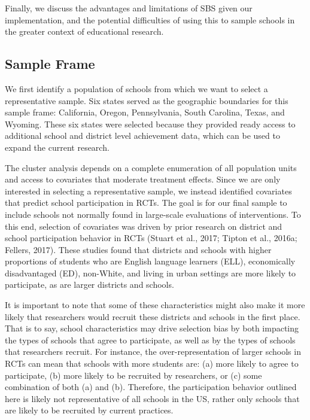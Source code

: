 \documentclass[man,floatsintext]{apa6}
\begin{document}
Finally, we discuss the advantages and limitations of SBS given our implementation, and the potential difficulties of using this to sample schools in the greater context of educational research.

\hypertarget{sample-frame}{%
\subsection{Sample Frame}\label{sample-frame}}

We first identify a population of schools from which we want to select a representative sample. Six states served as the geographic boundaries for this sample frame: California, Oregon, Pennsylvania, South Carolina, Texas, and Wyoming. These six states were selected because they provided ready access to additional school and district level achievement data, which can be used to expand the current research.

The cluster analysis depends on a complete enumeration of all population units and access to covariates that moderate treatment effects. Since we are only interested in selecting a representative sample, we instead identified covariates that predict school participation in RCTs. The goal is for our final sample to include schools not normally found in large-scale evaluations of interventions. To this end, selection of covariates was driven by prior research on district and school participation behavior in RCTs (Stuart et al., 2017; Tipton et al., 2016a; Fellers, 2017). These studies found that districts and schools with higher proportions of students who are English language learners (ELL), economically disadvantaged (ED), non-White, and living in urban settings are more likely to participate, as are larger districts and schools.

It is important to note that some of these characteristics might also make it more likely that researchers would recruit these districts and schools in the first place. That is to say, school characteristics may drive selection bias by both impacting the types of schools that agree to participate, as well as by the types of schools that researchers recruit. For instance, the over-representation of larger schools in RCTs can mean that schools with more students are: (a) more likely to agree to participate, (b) more likely to be recruited by researchers, or (c) some combination of both (a) and (b). Therefore, the participation behavior outlined here is likely not representative of all schools in the US, rather only schools that are likely to be recruited by current practices.
\end{document}
